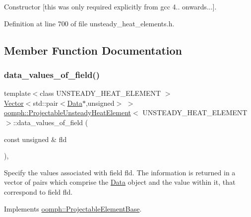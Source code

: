 Constructor \mbox{[}this was only required explicitly from gcc 4.. onwards...\mbox{]}. 



Definition at line 700 of file unsteady\+\_\+heat\+\_\+elements.\+h.



\subsection{Member Function Documentation}
\mbox{\label{classoomph_1_1ProjectableUnsteadyHeatElement_a5e80bbc5a4d70f51fe842bb90f988d31}} 
\subsubsection{\texorpdfstring{data\+\_\+values\+\_\+of\+\_\+field()}{data\_values\_of\_field()}}
{\footnotesize\ttfamily template$<$class U\+N\+S\+T\+E\+A\+D\+Y\+\_\+\+H\+E\+A\+T\+\_\+\+E\+L\+E\+M\+E\+NT $>$ \\
\hyperlink{classoomph_1_1Vector}{Vector}$<$std\+::pair$<$\hyperlink{classoomph_1_1Data}{Data}$\ast$,unsigned$>$ $>$ \hyperlink{classoomph_1_1ProjectableUnsteadyHeatElement}{oomph\+::\+Projectable\+Unsteady\+Heat\+Element}$<$ U\+N\+S\+T\+E\+A\+D\+Y\+\_\+\+H\+E\+A\+T\+\_\+\+E\+L\+E\+M\+E\+NT $>$\+::data\+\_\+values\+\_\+of\+\_\+field (\begin{DoxyParamCaption}\item[{const unsigned \&}]{fld }\end{DoxyParamCaption})\hspace{0.3cm}{\ttfamily [inline]}, {\ttfamily [virtual]}}



Specify the values associated with field fld. The information is returned in a vector of pairs which comprise the \hyperlink{classoomph_1_1Data}{Data} object and the value within it, that correspond to field fld. 



Implements \hyperlink{classoomph_1_1ProjectableElementBase_a644306ebdf16f334344c2d27d72f18b7}{oomph\+::\+Projectable\+Element\+Base}.



